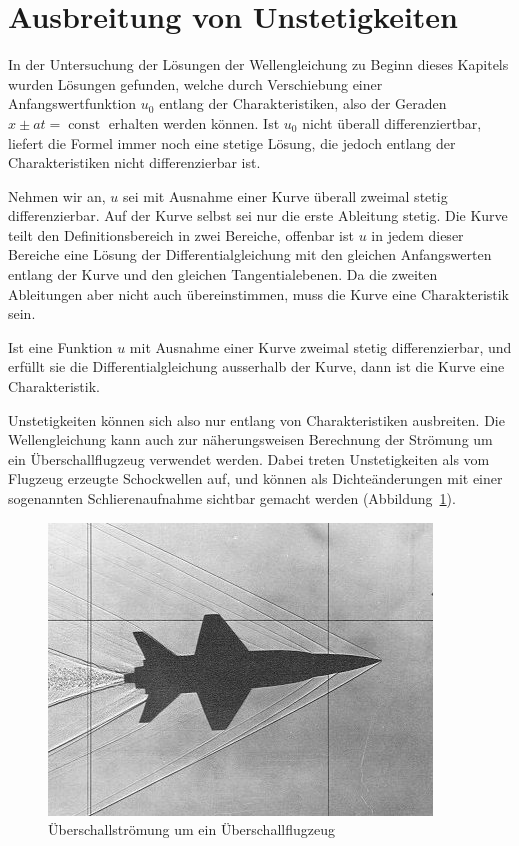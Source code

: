 %
%
%
\section{Ausbreitung von Unstetigkeiten}
In der Untersuchung der Lösungen der Wellengleichung zu Beginn
dieses Kapitels wurden Lösungen gefunden, welche durch Verschiebung
einer Anfangswertfunktion $u_0$ entlang der 
Charakteristiken, also der Geraden 
$x\pm at=\operatorname{const}$ erhalten werden können. Ist $u_0$
nicht überall differenziertbar, liefert die Formel immer noch eine
stetige Lösung, die jedoch entlang der Charakteristiken nicht
differenzierbar ist.

Nehmen wir an, $u$ sei mit Ausnahme einer Kurve überall zweimal
stetig differenzierbar.
Auf der Kurve selbst sei nur die erste Ableitung stetig.
Die Kurve teilt den Definitionsbereich in zwei
Bereiche, offenbar ist $u$ in jedem dieser Bereiche eine 
Lösung der Differentialgleichung mit den gleichen Anfangswerten
entlang der Kurve und den gleichen Tangentialebenen.
Da die zweiten Ableitungen aber nicht auch übereinstimmen, muss
die Kurve eine Charakteristik sein.



\begin{satz}
Ist eine Funktion $u$ mit Ausnahme einer Kurve zweimal stetig
differenzierbar, und erfüllt sie die Differentialgleichung
ausserhalb der Kurve, dann ist die Kurve eine Charakteristik.
\end{satz}
Unstetigkeiten können sich also nur entlang von Charakteristiken
ausbreiten.
Die Wellengleichung kann auch zur näherungsweisen
Berechnung der Strömung um ein Überschallflugzeug verwendet werden.
Dabei treten Unstetigkeiten als vom Flugzeug erzeugte Schockwellen
auf, und können als Dichteänderungen mit einer
sogenannten Schlierenaufnahme sichtbar gemacht werden
(Abbildung~\ref{ueberschall2d}).

\begin{figure}
\begin{center}
\includegraphics[width=0.8\hsize]{../common/graphics/i-5-1}
\end{center}
\caption{Überschallströmung um ein Überschallflugzeug\label{ueberschall2d}}
\end{figure}

